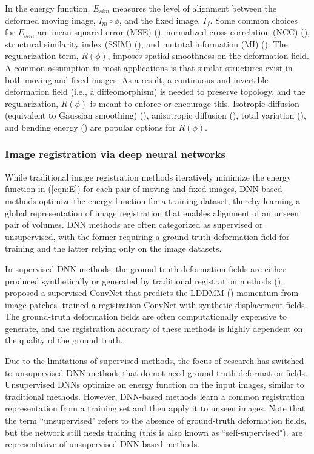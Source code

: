\documentclass[times,twocolumn,final]{elsarticle}
\begin{document}
In the energy function, $E_{sim}$ measures the level of alignment between the deformed moving image, $I_m\circ\phi$, and the fixed image, $I_f$. Some common choices for $E_{sim}$ are mean squared error (MSE) (\cite{beg2005computing, wolberg2000robust}), normalized cross-correlation (NCC) (\cite{avants2008symmetric}), structural similarity index (SSIM) (\cite{chen2020generating}), and mututal information (MI) (\cite{viola1997alignment}). The regularization term, $R(\phi)$, imposes spatial smoothness on the deformation field. A common assumption in most applications is that similar structures exist in both moving and fixed images. As a result, a continuous and invertible deformation field (i.e., a diffeomorphism) is needed to preserve topology, and the regularization, $R(\phi)$ is meant to enforce or encourage this. Isotropic diffusion (equivalent to Gaussian smoothing) (\cite{balakrishnan2019voxelmorph}), anisotropic diffusion (\cite{pace2013locally}), total variation (\cite{vishnevskiy2016isotropic}), and bending energy (\cite{johnson2002consistent}) are popular options for $R(\phi)$.

\subsubsection{Image registration via deep neural networks}
While traditional image registration methods iteratively minimize the energy function in (\ref{eqn:E}) for each pair of moving and fixed images, DNN-based methods optimize the energy function for a training dataset, thereby learning a global representation of image registration that enables alignment of an unseen pair of volumes. DNN methods are often categorized as supervised or unsupervised, with the former requiring a ground truth deformation field for training and the latter relying only on the image datasets. 

In supervised DNN methods, the ground-truth deformation fields are either produced synthetically or generated by traditional registration methods (\cite{yang2017quicksilver, sokooti2017nonrigid, cao2018deep}). \cite{yang2017quicksilver} proposed a supervised ConvNet that predicts the LDDMM (\cite{beg2005computing}) momentum from image patches. \cite{sokooti2017nonrigid} trained a registration ConvNet with synthetic displacement fields. The ground-truth deformation fields are often computationally expensive to generate, and the registration accuracy of these methods is highly dependent on the quality of the ground truth.

Due to the limitations of supervised methods, the focus of research has switched to unsupervised DNN methods that do not need ground-truth deformation fields. Unsupervised DNNs optimize an energy function on the input images, similar to traditional methods. However, DNN-based methods learn a common registration representation from a training set and then apply it to unseen images. Note that the term ``unsupervised" refers to the absence of ground-truth deformation fields, but the network still needs training (this is also known as ``self-supervised"). \cite{de2019deep, balakrishnan2018unsupervised, balakrishnan2019voxelmorph} are representative of unsupervised DNN-based methods.
\end{document}
